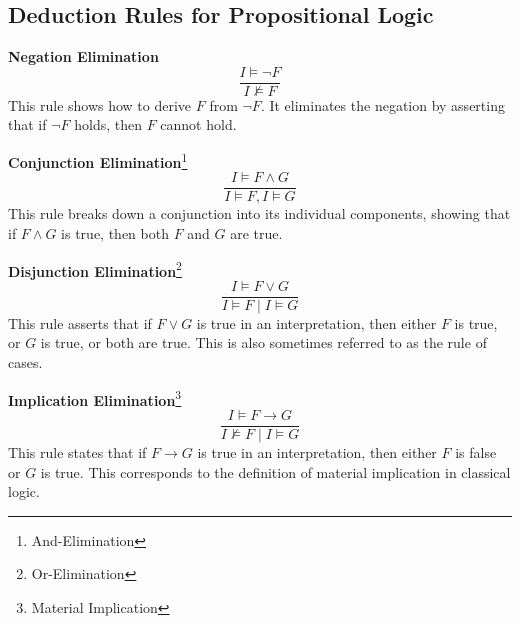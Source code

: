 \subsection{Deduction Rules for Propositional Logic}
\begin{center}
\begin{minipage}{.48\textwidth}
	\item \textbf{Negation Elimination}\[
	\frac{I\models\lnot F}{I\not\models F}
	\] This rule shows how to derive $F$ from $\lnot F$. It eliminates the negation by asserting that if $\lnot F$ holds, then $F$ cannot hold.
	\vspace{12pt}
	\item \textbf{Conjunction Elimination}\footnote{And-Elimination}\[
	\frac{I\models F\land G}{I\models F, I\models G}
	\] This rule breaks down a conjunction into its individual components, showing that if 
	$F\land G$ is true, then both $F$ and $G$ are true.
	\vspace{12pt}
	\item \textbf{Disjunction Elimination}\footnote{Or-Elimination} \[
	\frac{I\models F\lor G}{I\models F\mid I\models G}
	\] This rule asserts that if $F\lor G$ is true in an interpretation, then either 
	$F$ is true, or $G$ is true, or both are true. This is also sometimes referred to as the rule of cases.
	\vspace{12pt}
	\item \textbf{Implication Elimination}\footnote{Material Implication}\[
	\frac{I\models F\to G}{I\not\models F\mid I\models G}
	\] This rule states that if $F\to G$ is true in an interpretation, then either 
	$F$ is false or $G$ is true. This corresponds to the definition of material implication in classical logic.
	

\end{minipage}
\end{center}
